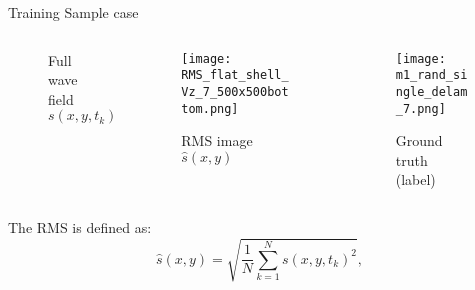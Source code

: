 \documentclass[10pt,aspectratio=169,dvipsnames]{beamer} %
\begin{document}
	\setcounter{subfigure}{0}
	\begin{frame}{Training Sample case}
		\begin{columns}[T]
			\begin{column}[c]{.32\textwidth}
				\begin{figure}
					\centering
					\caption{Full wavefield $s(x,y,t_k)$}
				\end{figure}
			\end{column}
			\begin{column}[c]{.32\textwidth}
				\begin{figure}
					\centering
					\texttt{[image: RMS\_flat\_shell\_Vz\_7\_500x500bottom.png]}
					\caption{RMS image $\hat{s}(x,y)$}
				\end{figure}
			\end{column}
			\begin{column}[c]{.32\textwidth}
				\begin{figure}
					\centering
					\texttt{[image: m1\_rand\_single\_delam\_7.png]}
					\caption{Ground truth (label)}
				\end{figure}
			\end{column}
		\end{columns}
		The RMS is defined as:
		\begin{equation}
			\hat{s}(x,y) = \sqrt{\frac{1}{N}\sum_{k=1}^{N}s(x,y,t_k)^2}, 
			\label{eqn:rms} 
		\end{equation}
	\end{frame}
	\setcounter{subfigure}{0}
\end{document}
